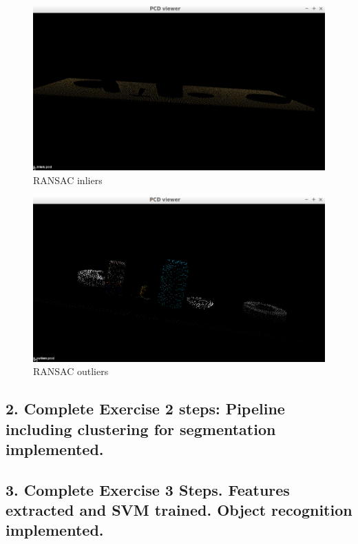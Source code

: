 \documentclass{article}
\begin{document}
\begin{figure}[H]
    \includegraphics[width=\linewidth]{ex1extractedinliers.png}
    \caption{RANSAC inliers}
    \label{fig:inliers}
\end{figure}

\begin{figure}[H]
    \includegraphics[width=\linewidth]{ex1extractedoutliers.png}
    \caption{RANSAC outliers}
    \label{fig:outliers}
\end{figure}

\subsection{2. Complete Exercise 2 steps: Pipeline including clustering for segmentation implemented.}

\subsection{3. Complete Exercise 3 Steps.  Features extracted and SVM trained.  Object recognition implemented.}
\end{document}
